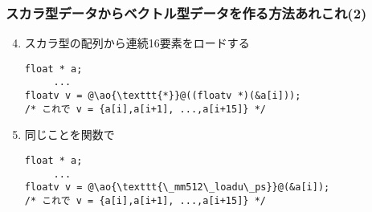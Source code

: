 \documentclass[10pt,dvipdfmx]{beamer}
\newcommand{\ao}[1]{{\color{blue}#1}}
\newcommand{\aka}[1]{{\color{red}#1}}
\begin{document}
\begin{frame}[fragile]
\frametitle{スカラ型データからベクトル型データを作る方法あれこれ(2)}
\begin{enumerate}
   \setcounter{enumi}{3}
 \item スカラ型の配列から連続16要素をロードする
\begin{lstlisting}
float * a;
     ...
floatv v = @\ao{\texttt{*}}@((floatv *)(&a[i]));
/* これで v = {a[i],a[i+1], ...,a[i+15]} */     
\end{lstlisting}

\item 同じことを関数で
\begin{lstlisting}
float * a;
     ...
floatv v = @\ao{\texttt{\_mm512\_loadu\_ps}}@(&a[i]);
/* これで v = {a[i],a[i+1], ...,a[i+15]} */
\end{lstlisting}
\end{enumerate}
\end{frame}

\iffalse
\begin{frame}[fragile]
  \frametitle{注意}
  \begin{itemize}
  \item 方法2 \verb+_mm256_set_ps(0,10,20,30,40,50,60,70)+は,
    そのような命令があるわけではなく, 遅い場合が多い.
    全てをメモリに一度ストアして, 方法4でロードしていたりする
    
  \item 方法5の\verb+_mm256_load_ps(&a[i])+
    はアドレスが32の倍数で
    (32バイト境界にalignされてい)なくてはならない, という制限があり,
    それを破るとSegmentation Faultになる. \aka{以降使わない.}
    
  \item 方法4や方法5の\ao{\texttt{\_mm256\_loadu\_ps}}にはそのような制限はなく,
    性能のペナルティもないのでこれを使うのを\ao{推奨}

  \item 方法4で\ao{\texttt{\_mm256\_loadu\_ps}}が使われるのは,
    {\tt floatv}を定義する時に
    {\tt aligned(sizeof(float))}としたため. これを省略すると,
    \ao{\texttt{\_mm256\_load\_ps}}を使われてやっかいなことになる
  \end{itemize}
\end{frame}
\fi
\end{document}
